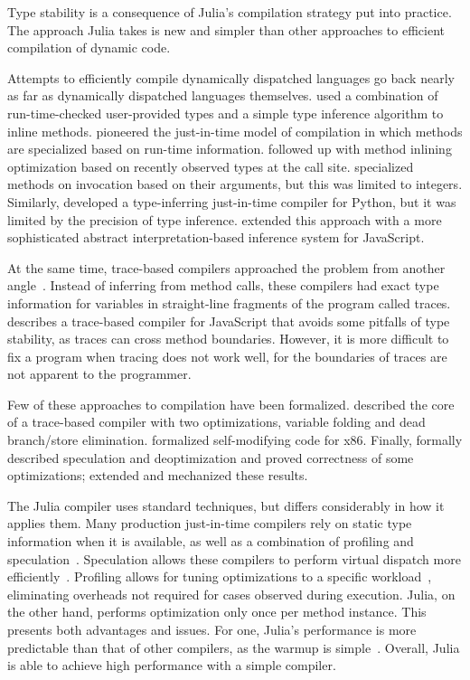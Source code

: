 \documentclass[oneside,openright,titlepage,numbers=noenddot,%
headinclude,footinclude,cleardoublepage=empty,abstract=on,
BCOR=5mm,paper=a4,fontsize=11pt,
dvipsnames
]{scrreprt}
\begin{document}
Type stability is a consequence of Julia's compilation strategy put into
practice. The approach Julia takes is new and simpler than other approaches to
efficient compilation of dynamic code.

Attempts to efficiently compile dynamically dispatched languages go back nearly
as far as dynamically dispatched languages themselves.
\citet{HurricaneSmalltalk} used a combination of run-time-checked user-provided
types and a simple type inference algorithm to inline methods. \citet{CU89}
pioneered the just-in-time model of compilation in which methods are specialized
based on run-time information. \citet{holzle1994odd} followed up with method
inlining optimization based on recently observed types at the call site.
\citet{Psyco2004} specialized methods on invocation based on their arguments,
but this was limited to integers. Similarly, \citet{cannon2005localized} developed a
type-inferring just-in-time compiler for Python, but it was limited by the
precision of type inference. \citet{RATA} extended this approach with a more
sophisticated abstract interpretation-based inference system for JavaScript.

At the same time, trace-based compilers approached the problem from another
angle~\cite{chang2007efficient}.
Instead of inferring from method calls, these compilers had exact type
information for variables in straight-line fragments of the program called
traces. \citet{gal09} describes a trace-based compiler for JavaScript that avoids
some pitfalls of type stability, as traces can cross method boundaries.
However, it is more difficult to fix a program when tracing does not work well,
for the boundaries of traces are not apparent to the programmer.

Few of these approaches to compilation have been formalized.
\citet{CompilingWithTraces} described the core of a trace-based compiler with
two optimizations, variable folding and dead branch/store elimination.
\citet{VerifiedJITx86} formalized self-modifying code for x86. Finally,
\citet{popl18} formally described speculation and deoptimization and proved
correctness of some optimizations; \citet{oopsla21} extended and mechanized
these results.

The Julia compiler uses standard techniques, but differs considerably in how it
applies them. Many production just-in-time compilers rely on static type
information when it is available, as well as a combination of profiling and
speculation~\cite{TruffleIR,TruffleInterpreters}. Speculation allows these
compilers to perform virtual dispatch more efficiently~\cite{oopsla20c}. Profiling allows
for tuning optimizations to a specific workload~\cite{GoWithTheFlow,HHVMJIT},
eliminating overheads not required for cases observed during execution. Julia, on
the other hand, performs optimization only once per method instance.
This presents both advantages
and issues. For one, Julia's performance is more predictable than that of other
compilers, as the warmup is simple~\cite{VMsBlow}. Overall, Julia is able
to achieve high performance with a simple compiler.
\end{document}

